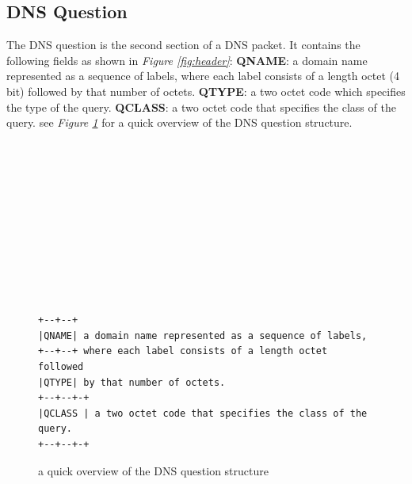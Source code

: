 \documentclass[12pt]{article}
\begin{document}
\subsection{DNS Question}
The DNS question is the second section of a DNS packet. It contains the following fields as shown in \textit{Figure \ref{fig:header}}:
\textbf{QNAME}: a domain name represented as a sequence of labels, where each label consists of a length octet (4 bit) followed by that number of octets.
\textbf{QTYPE}: a two octet code which specifies the type of the query.
\textbf{QCLASS}: a two octet code that specifies the class of the query.
see \textit{Figure \ref{fig:question}} for a quick overview of the DNS question structure.
\\
\\
\\
\\
\\
\\
\\
\\
\\
\\
\\
\\

\begin{figure}
\begin{lstlisting}
+--+--+
|QNAME| a domain name represented as a sequence of labels,
+--+--+ where each label consists of a length octet followed
|QTYPE| by that number of octets.
+--+--+-+
|QCLASS | a two octet code that specifies the class of the query.
+--+--+-+
\end{lstlisting}
\caption{a quick overview of the DNS question structure}
\label{fig:question}
\end{figure}
\end{document}
